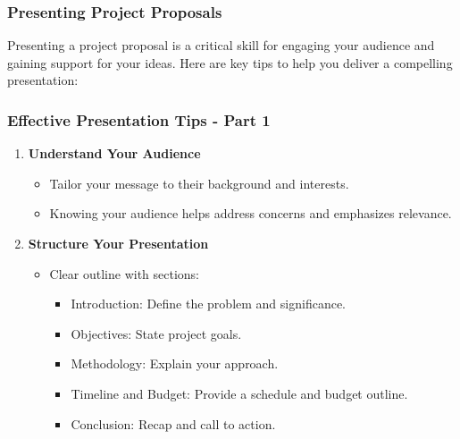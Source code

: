 \documentclass[aspectratio=169]{beamer}
\begin{document}
\begin{frame}[fragile]
    \frametitle{Presenting Project Proposals}
    Presenting a project proposal is a critical skill for engaging your audience and gaining support for your ideas. Here are key tips to help you deliver a compelling presentation:
\end{frame}

\begin{frame}[fragile]
    \frametitle{Effective Presentation Tips - Part 1}
    \begin{enumerate}
        \item \textbf{Understand Your Audience}
        \begin{itemize}
            \item Tailor your message to their background and interests.
            \item Knowing your audience helps address concerns and emphasizes relevance.
        \end{itemize}
        
        \item \textbf{Structure Your Presentation}
        \begin{itemize}
            \item Clear outline with sections:
            \begin{itemize}
                \item Introduction: Define the problem and significance.
                \item Objectives: State project goals.
                \item Methodology: Explain your approach.
                \item Timeline and Budget: Provide a schedule and budget outline.
                \item Conclusion: Recap and call to action.
            \end{itemize}
        \end{itemize}
    \end{enumerate}
\end{frame}
\end{document}
